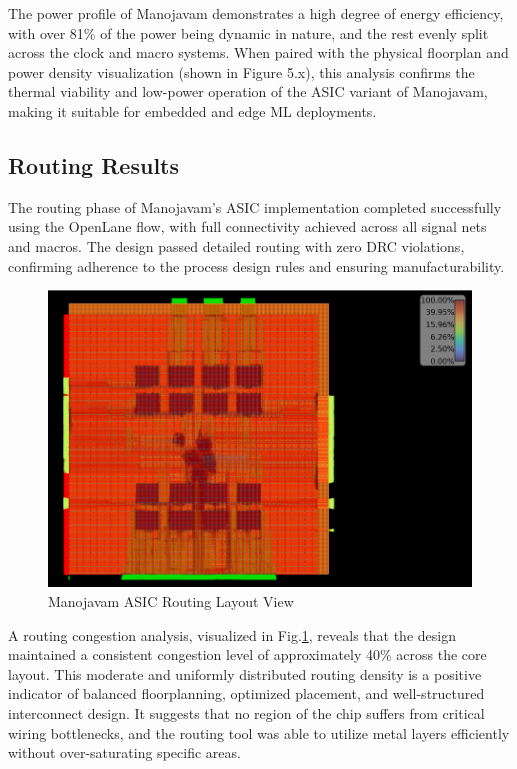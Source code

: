 The power profile of Manojavam demonstrates a high degree of energy efficiency, with over 81\% of the power being dynamic in nature, and the rest evenly split across the clock and macro systems. When paired with the physical floorplan and power density visualization (shown in Figure 5.x), this analysis confirms the thermal viability and low-power operation of the ASIC variant of Manojavam, making it suitable for embedded and edge ML deployments. 

\subsection{Routing Results}
The routing phase of Manojavam's ASIC implementation completed successfully using the OpenLane flow, with full connectivity achieved across all signal nets and macros. The design passed detailed routing with zero DRC violations, confirming adherence to the process design rules and ensuring manufacturability.

\begin{figure}
	\centerline{\includegraphics[scale = 0.80]{Figures/routing_layout.png}}
	\caption{Manojavam ASIC Routing Layout View}
	\label{fig:Manojavam ASIC Routing Layout View}
\end{figure}

A routing congestion analysis, visualized in Fig.\ref{fig:Manojavam ASIC Routing Layout View}, reveals that the design maintained a consistent congestion level of approximately 40\% across the core layout. This moderate and uniformly distributed routing density is a positive indicator of balanced floorplanning, optimized placement, and well-structured interconnect design. It suggests that no region of the chip suffers from critical wiring bottlenecks, and the routing tool was able to utilize metal layers efficiently without over-saturating specific areas.

